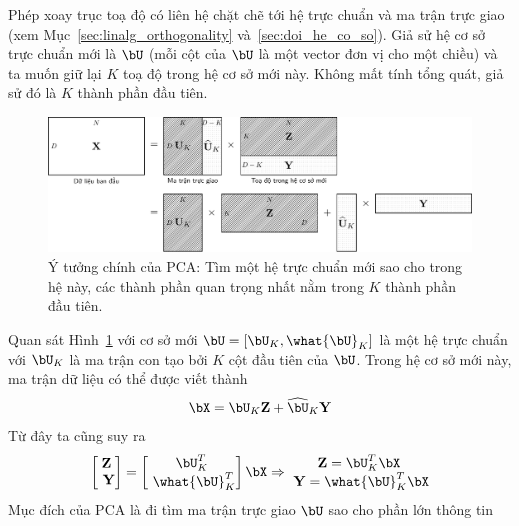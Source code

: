 Phép xoay trục toạ độ có liên hệ chặt chẽ tới hệ trực chuẩn và ma trận trực giao
(xem Mục~\ref{sec:linalg_orthogonality} và~\ref{sec:doi_he_co_so}). Giả sử hệ cơ
sở trực chuẩn mới là $\bU$ (mỗi cột của $\bU$ là một vector đơn vị cho
một chiều) và ta muốn giữ lại $K$ toạ độ trong hệ
cơ sở mới này. Không mất tính tổng quát, giả sử đó là $K$ thành phần đầu tiên.
\begin{figure}[t]
\centering
    \includegraphics[width = \textwidth]{Chapters/07_DimemsionalityReduction/27_pca/latex/pca_idea.pdf}
    \caption[]{Ý tưởng chính của PCA: Tìm một hệ trực chuẩn mới sao cho trong hệ này, các thành phần quan trọng nhất nằm trong $K$ thành phần đầu tiên.}
    \label{fig:27_3}
\end{figure}
Quan sát Hình~\ref{fig:27_3} với cơ sở mới $\bU =
[\bU_K, \what{\bU}_K]$ là một hệ trực chuẩn với $\bU_K$ là ma trận con tạo bởi $K$ cột đầu tiên của $\bU$. Trong hệ cơ sở mới này, ma trận dữ liệu có thể được viết thành
\begin{equation} 
\label{eqn:27_8}
    \bX = \bU_K \mathbf{Z} + \widehat{\bU}_K \mathbf{Y}
\end{equation} 
Từ đây ta cũng suy ra
\begin{eqnarray} 
\label{eqn:27_9}
    \left[\begin{matrix} \mathbf{Z} \\\ \mathbf{Y} \end{matrix} \right] =  
    \left[\begin{matrix} \bU_K^T \\\ \what{\bU}_K^T \end{matrix} \right]\bX \Rightarrow 
    \begin{matrix} 
    \mathbf{Z} = \bU_K^T \bX \\\ 
    \mathbf{Y} = \what{\bU}_K^T\bX 
    \end{matrix} 
\end{eqnarray}
Mục đích của PCA là đi tìm ma trận trực giao $\bU$ sao cho phần lớn thông tin
